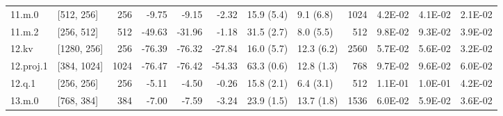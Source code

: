 \begin{table}
\begin{tabular}{llrrrrllrrrr}
11.m.0 & [512, 256] & 256 & {\cellcolor[HTML]{FFFBB8}} \color[HTML]{000000} -9.75 & {\cellcolor[HTML]{FFFCBA}} \color[HTML]{000000} -9.15 & {\cellcolor[HTML]{EFF8AA}} \color[HTML]{000000} -2.32 & 15.9 (5.4) & 9.1 (6.8) & 1024 & {\cellcolor[HTML]{ECF7A6}} \color[HTML]{000000} 4.2E-02 & {\cellcolor[HTML]{ECF7A6}} \color[HTML]{000000} 4.1E-02 & {\cellcolor[HTML]{D1EC86}} \color[HTML]{000000} 2.1E-02 \\
11.m.2 & [256, 512] & 512 & {\cellcolor[HTML]{F36B42}} \color[HTML]{F1F1F1} -49.63 & {\cellcolor[HTML]{FDB96A}} \color[HTML]{000000} -31.96 & {\cellcolor[HTML]{ECF7A6}} \color[HTML]{000000} -1.18 & 31.5 (2.7) & 8.0 (5.5) & 512 & {\cellcolor[HTML]{FEC877}} \color[HTML]{000000} 9.8E-02 & {\cellcolor[HTML]{FED27F}} \color[HTML]{000000} 9.3E-02 & {\cellcolor[HTML]{E9F6A1}} \color[HTML]{000000} 3.9E-02 \\
12.kv & [1280, 256] & 256 & {\cellcolor[HTML]{A50026}} \color[HTML]{F1F1F1} -76.39 & {\cellcolor[HTML]{A50026}} \color[HTML]{F1F1F1} -76.32 & {\cellcolor[HTML]{FEC877}} \color[HTML]{000000} -27.84 & 16.0 (5.7) & 12.3 (6.2) & 2560 & {\cellcolor[HTML]{FFFDBC}} \color[HTML]{000000} 5.7E-02 & {\cellcolor[HTML]{FFFEBE}} \color[HTML]{000000} 5.6E-02 & {\cellcolor[HTML]{E0F295}} \color[HTML]{000000} 3.2E-02 \\
12.proj.1 & [384, 1024] & 1024 & {\cellcolor[HTML]{A50026}} \color[HTML]{F1F1F1} -76.47 & {\cellcolor[HTML]{A50026}} \color[HTML]{F1F1F1} -76.42 & {\cellcolor[HTML]{E95538}} \color[HTML]{F1F1F1} -54.33 & 63.3 (0.6) & 12.8 (1.3) & 768 & {\cellcolor[HTML]{FECA79}} \color[HTML]{000000} 9.7E-02 & {\cellcolor[HTML]{FECC7B}} \color[HTML]{000000} 9.6E-02 & {\cellcolor[HTML]{FFFAB6}} \color[HTML]{000000} 6.0E-02 \\
12.q.1 & [256, 256] & 256 & {\cellcolor[HTML]{F8FCB6}} \color[HTML]{000000} -5.11 & {\cellcolor[HTML]{F5FBB2}} \color[HTML]{000000} -4.50 & {\cellcolor[HTML]{EBF7A3}} \color[HTML]{000000} -0.26 & 15.8 (2.1) & 6.4 (3.1) & 512 & {\cellcolor[HTML]{FDBD6D}} \color[HTML]{000000} 1.1E-01 & {\cellcolor[HTML]{FDBF6F}} \color[HTML]{000000} 1.0E-01 & {\cellcolor[HTML]{ECF7A6}} \color[HTML]{000000} 4.2E-02 \\
13.m.0 & [768, 384] & 384 & {\cellcolor[HTML]{FDFEBC}} \color[HTML]{000000} -7.00 & {\cellcolor[HTML]{FEFFBE}} \color[HTML]{000000} -7.59 & {\cellcolor[HTML]{F2FAAE}} \color[HTML]{000000} -3.24 & 23.9 (1.5) & 13.7 (1.8) & 1536 & {\cellcolor[HTML]{FFFBB8}} \color[HTML]{000000} 6.0E-02 & {\cellcolor[HTML]{FFFBB8}} \color[HTML]{000000} 5.9E-02 & {\cellcolor[HTML]{E6F59D}} \color[HTML]{000000} 3.6E-02 \\

\end{tabular}
\end{table}
